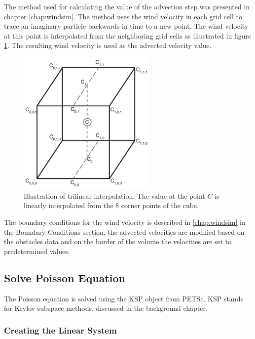 The method used for calculating the value of the advection step was presented
in chapter \ref{chap:windsim}. The method uses the wind velocity in each grid cell
to trace an imaginary particle backwards in time to a new point. The wind velocity
at this point is interpolated from the neighboring grid cells as illustrated in
figure \ref{fig:trilinearinterpolation}. The resulting wind velocity is used as
the advected velocity value.

\begin{figure}[ht]
	\center
	\includegraphics[width=0.6\textwidth]{images/trilinear_interpolation}
	\caption{Illustration of trilinear interpolation. The value at the point
	$C$ is linearly interpolated from the 8 corner points of the cube.}
	\label{fig:trilinearinterpolation}
\end{figure}

The boundary conditions for the wind velocity is described in \ref{chap:windsim}
in the Boundary Conditions section, the advected velocities are modified based on
the obstacles data and on the border of the volume the velocities are set to
predetermined values.

\subsection{Solve Poisson Equation}

The Poisson equation is solved using the KSP object from PETSc. KSP stands for
Krylov subspace methods, discussed in the background chapter.

\subsubsection{Creating the Linear System}

